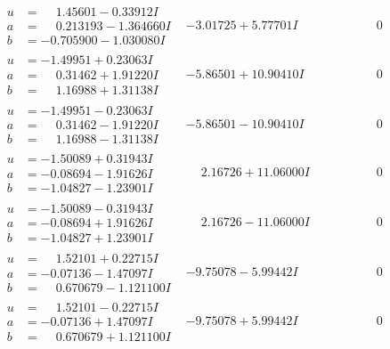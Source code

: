 \documentclass[1p]{elsarticle_modified}
\theoremstyle{definition}
\begin{document}
$$\begin{array}{c|c|c}
\begin{aligned}
u &= \phantom{-}1.45601 - 0.33912 I \\
a &= \phantom{-}0.213193 - 1.364660 I \\
b &= -0.705900 - 1.030080 I\end{aligned}
 & -3.01725 + 5.77701 I & \phantom{-0.000000 } 0 \\ \hline\begin{aligned}
u &= -1.49951 + 0.23063 I \\
a &= \phantom{-}0.31462 + 1.91220 I \\
b &= \phantom{-}1.16988 + 1.31138 I\end{aligned}
 & -5.86501 + 10.90410 I & \phantom{-0.000000 } 0 \\ \hline\begin{aligned}
u &= -1.49951 - 0.23063 I \\
a &= \phantom{-}0.31462 - 1.91220 I \\
b &= \phantom{-}1.16988 - 1.31138 I\end{aligned}
 & -5.86501 - 10.90410 I & \phantom{-0.000000 } 0 \\ \hline\begin{aligned}
u &= -1.50089 + 0.31943 I \\
a &= -0.08694 - 1.91626 I \\
b &= -1.04827 - 1.23901 I\end{aligned}
 & \phantom{-}2.16726 + 11.06000 I & \phantom{-0.000000 } 0 \\ \hline\begin{aligned}
u &= -1.50089 - 0.31943 I \\
a &= -0.08694 + 1.91626 I \\
b &= -1.04827 + 1.23901 I\end{aligned}
 & \phantom{-}2.16726 - 11.06000 I & \phantom{-0.000000 } 0 \\ \hline\begin{aligned}
u &= \phantom{-}1.52101 + 0.22715 I \\
a &= -0.07136 - 1.47097 I \\
b &= \phantom{-}0.670679 - 1.121100 I\end{aligned}
 & -9.75078 - 5.99442 I & \phantom{-0.000000 } 0 \\ \hline\begin{aligned}
u &= \phantom{-}1.52101 - 0.22715 I \\
a &= -0.07136 + 1.47097 I \\
b &= \phantom{-}0.670679 + 1.121100 I\end{aligned}
 & -9.75078 + 5.99442 I & \phantom{-0.000000 } 0 \\ \hline\begin{aligned}

\end{aligned}
\end{array}$$
\end{document}
